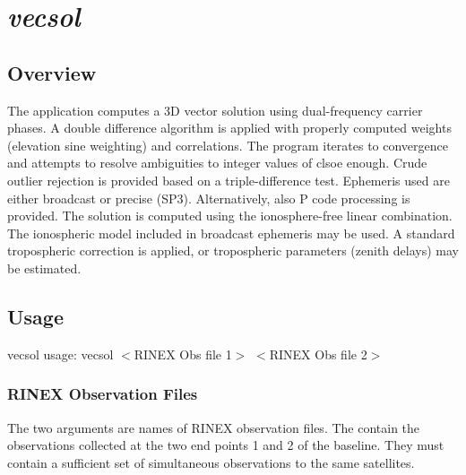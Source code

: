 %
%


\section{\emph{vecsol}}
\subsection{Overview}
The application computes a 3D vector solution using dual-frequency carrier phases. A double difference
algorithm is applied with properly computed weights (elevation sine weighting) and correlations. The program
iterates to convergence and attempts to resolve ambiguities to integer values of clsoe enough. Crude outlier rejection
is provided based on a triple-difference test. Ephemeris used are either broadcast or precise (SP3). Alternatively, also P code
processing is provided.
The solution is computed using the ionosphere-free linear combination. The ionospheric model included in broadcast ephemeris may be used. A standard tropospheric correction is applied, or tropospheric parameters (zenith delays) may be estimated.

\subsection{Usage}
\begin{\outputsize}
vecsol usage: vecsol $<$RINEX Obs file 1$>$ $<$RINEX Obs file 2$>$
\end{\outputsize}

\subsubsection{RINEX Observation Files}
The two arguments are names of RINEX observation files. The contain the observations collected at the two end points 1 and 2 of the baseline.
They must contain a sufficient set of simultaneous observations to the same satellites.


